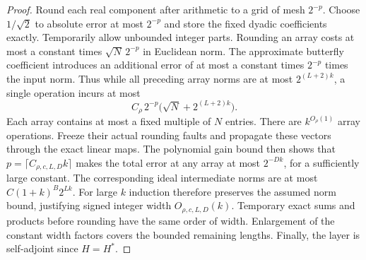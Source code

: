 \begin{proof}
Round each real component after arithmetic to a grid of mesh \(2^{-p}\).
Choose \(1/\sqrt2\) to absolute error at most \(2^{-p}\) and store the
fixed dyadic coefficients exactly. Temporarily allow unbounded integer
parts. Rounding an array costs at most a constant times
\(\sqrt N\,2^{-p}\) in Euclidean norm. The approximate butterfly
coefficient introduces an additional error of at most a constant times
\(2^{-p}\) times the input norm. Thus while all preceding array norms
are at most \(2^{(L+2)k}\), a single operation incurs at most
\[
 C_\rho\,2^{-p}\bigl(\sqrt N+2^{(L+2)k}\bigr).
\]
Each array contains at most a fixed multiple of \(N\) entries. There
are \(k^{O_\rho(1)}\) array operations. Freeze their actual rounding
faults and propagate these vectors through the exact linear maps.
The polynomial gain bound then shows that \(p=\lceil C_{\rho,c,L,D}k\rceil\)
makes the total error at any array at most \(2^{-Dk}\), for a
sufficiently large constant. The corresponding ideal intermediate
norms are at most \(C(1+k)^B2^{Lk}\). For large \(k\) induction
therefore preserves the assumed norm bound, justifying signed integer
width \(O_{\rho,c,L,D}(k)\). Temporary exact sums and products before
rounding have the same order of width. Enlargement of the constant
width factors covers the bounded remaining lengths. Finally, the layer
is self-adjoint since \(H=H^*\).
\end{proof}
